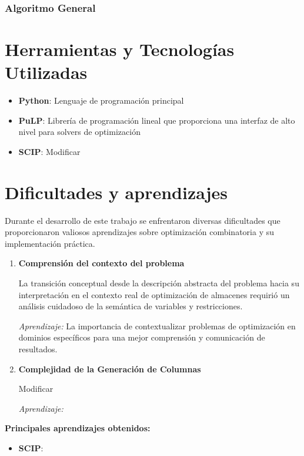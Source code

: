\documentclass[a4paper,12pt]{article}
\begin{document}
\subsubsection{Algoritmo General}

\clearpage

\section{Herramientas y Tecnologías Utilizadas}

\begin{itemize}
    \item \textbf{Python}: Lenguaje de programación principal
    \item \textbf{PuLP}: Librería de programación lineal que proporciona una interfaz de alto nivel para solvers de optimización
    \item \textbf{SCIP}: Modificar

\end{itemize}

\section{Dificultades y aprendizajes}

Durante el desarrollo de este trabajo se enfrentaron diversas dificultades que proporcionaron valiosos aprendizajes sobre optimización combinatoria y su implementación práctica.

\begin{enumerate}
    \item \textbf{Comprensión del contexto del problema}
    
    La transición conceptual desde la descripción abstracta del problema hacia su interpretación en el contexto real de optimización de almacenes requirió un análisis cuidadoso de la semántica de variables y restricciones.
    
    \emph{Aprendizaje:} La importancia de contextualizar problemas de optimización en dominios específicos para una mejor comprensión y comunicación de resultados.


    \item \textbf{Complejidad de la Generación de Columnas}
    
    Modificar
    
    \emph{Aprendizaje:} 

\end{enumerate}

\textbf{Principales aprendizajes obtenidos:}

\begin{itemize}
    \item \textbf{SCIP}: 
    
\end{itemize}
\end{document}
